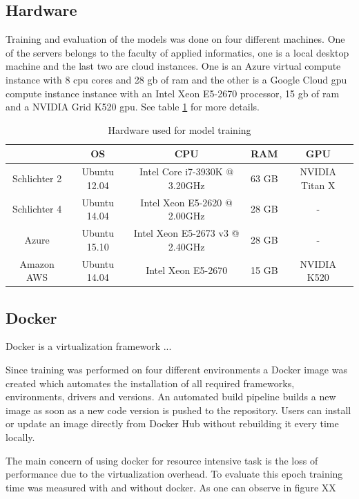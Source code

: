 \subsection{Hardware}

Training and evaluation of the models was done on four different machines. One of the servers belongs to the faculty of applied informatics, one is a local desktop machine and the last two are cloud instances. One is an Azure virtual compute instance with 8 \gls{cpu} cores and 28 \gls{gb} of \gls{ram} and the other is a Google Cloud \gls{gpu} compute instance instance with an Intel Xeon E5-2670 processor, 15 \gls{gb} of \gls{ram} and a NVIDIA Grid K520 \gls{gpu}. See table \ref{tab:05_usedHardware} for more details.
\begin{table}[hbt]
	\centering
	\caption{Hardware used for model training}
	\label{tab:05_usedHardware}
	\begin{tabular}{@{}ccccc@{}}
		\toprule
		\multicolumn{1}{c}{\textbf{}}    & \multicolumn{1}{c}{\textbf{OS}} & \multicolumn{1}{c}{\textbf{CPU}}                    & \multicolumn{1}{c}{\textbf{RAM}} & \multicolumn{1}{c}{\textbf{GPU}}     \\ \midrule
		Schlichter 2 & Ubuntu 12.04              & Intel Core i7-3930K @ 3.20GHz   & 63 GB        & NVIDIA Titan X \\ \midrule
		Schlichter 4 & Ubuntu 14.04              & Intel Xeon E5-2620 @ 2.00GHz    & 28 GB        & -                \\ \midrule
		Azure        & Ubuntu 15.10              & Intel Xeon E5-2673 v3 @ 2.40GHz & 28 GB        & -                \\ \midrule
		Amazon AWS   & Ubuntu 14.04              & Intel Xeon E5-2670              & 15 GB        & NVIDIA K520 \\ \bottomrule
	\end{tabular}
\end{table}


\subsection{Docker}

Docker is a virtualization framework ...


Since training was performed on four different environments a Docker image was created which automates the installation of all required frameworks, environments, drivers and versions. An automated build pipeline builds a new image as soon as a new code version is pushed to the repository. Users can install or update an image directly from Docker Hub without rebuilding it every time locally.

The main concern of using docker for resource intensive task is the loss of performance due to the virtualization overhead. To evaluate this epoch training time was measured with and without docker. As one can observe in figure XX 



